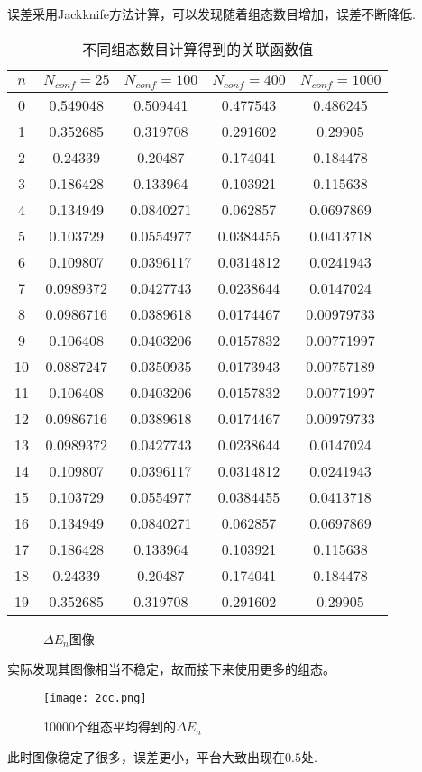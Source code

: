 \documentclass[UTF8]{ctexart}
\begin{document}
误差采用Jackknife方法计算，可以发现随着组态数目增加，误差不断降低.

\begin{table}[H]
    \centering
    \begin{tabular}{|c|c|c|c|c|}
        \hline
        $n$ & $N_{conf}=25$ & $N_{conf}=100$ & $N_{conf}=400$ & $N_{conf}=1000$ \\
        \hline
        0&0.549048&0.509441&0.477543&0.486245\\
1&0.352685&0.319708&0.291602&0.29905\\
2&0.24339&0.20487&0.174041&0.184478\\
3&0.186428&0.133964&0.103921&0.115638\\
4&0.134949&0.0840271&0.062857&0.0697869\\
5&0.103729&0.0554977&0.0384455&0.0413718\\
6&0.109807&0.0396117&0.0314812&0.0241943\\
7&0.0989372&0.0427743&0.0238644&0.0147024\\
8&0.0986716&0.0389618&0.0174467&0.00979733\\
9&0.106408&0.0403206&0.0157832&0.00771997\\
10&0.0887247&0.0350935&0.0173943&0.00757189\\
11&0.106408&0.0403206&0.0157832&0.00771997\\
12&0.0986716&0.0389618&0.0174467&0.00979733\\
13&0.0989372&0.0427743&0.0238644&0.0147024\\
14&0.109807&0.0396117&0.0314812&0.0241943\\
15&0.103729&0.0554977&0.0384455&0.0413718\\
16&0.134949&0.0840271&0.062857&0.0697869\\
17&0.186428&0.133964&0.103921&0.115638\\
18&0.24339&0.20487&0.174041&0.184478\\
19&0.352685&0.319708&0.291602&0.29905\\
\hline
    \end{tabular}
    \caption{不同组态数目计算得到的关联函数值}
\end{table}

\begin{figure}[H]
    \centering
    \subfigure[$N_{conf}=25$]{
    \texttt{[image: Npar=25.png]}
    }
    \subfigure[$N_{conf}=100$]{
    \texttt{[image: Npar=100.png]}
    }

    \subfigure[$N_{conf}=400$]{
    \texttt{[image: Npar=400.png]}
    }
    \subfigure[$N_{conf}=10000$]{
    \texttt{[image: Npar=1000.png]}
    }
    \caption{$\Delta E_n$图像}
\end{figure}

实际发现其图像相当不稳定，故而接下来使用更多的组态。

\begin{figure}[H]
    \centering
    \texttt{[image: 2cc.png]}
    \caption{10000个组态平均得到的$\Delta E_n$}
\end{figure}

此时图像稳定了很多，误差更小，平台大致出现在$0.5$处.
\end{document}
